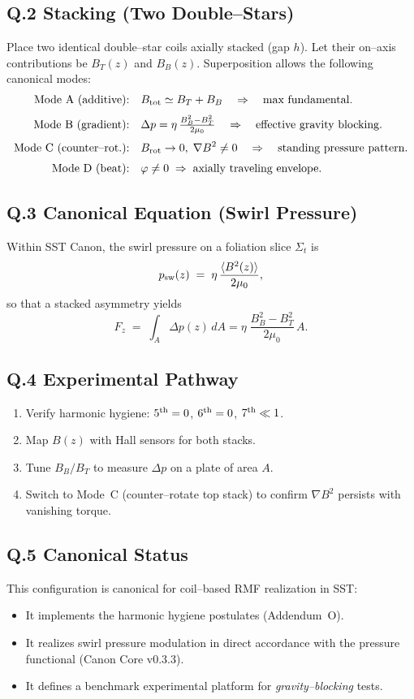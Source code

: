 \documentclass[11pt,a4paper]{article}
\begin{document}
\subsection*{Q.2 Stacking (Two Double--Stars)}
Place two identical double--star coils axially stacked (gap $h$).
Let their on--axis contributions be $B_T(z)$ and $B_B(z)$.
Superposition allows the following canonical modes:
\begin{align*}
	\text{Mode A (additive):}&\quad B_{\rm tot}\simeq B_T+B_B
	\quad\Rightarrow\quad \text{max fundamental}.\\[3pt]
	\text{Mode B (gradient):}&\quad \Delta p = \eta\,\tfrac{B_B^2-B_T^2}{2\mu_0}
	\quad\Rightarrow\quad \text{effective gravity blocking}.\\[3pt]
	\text{Mode C (counter--rot.):}&\quad B_{\rm rot}\to 0,\;
	\nabla B^2\neq 0
	\quad\Rightarrow\quad \text{standing pressure pattern}.\\[3pt]
	\text{Mode D (beat):}&\quad \varphi\neq 0\;\Rightarrow\;\text{axially traveling envelope}.
\end{align*}

\subsection*{Q.3 Canonical Equation (Swirl Pressure)}
Within SST Canon, the swirl pressure on a foliation slice $\Sigma_t$ is
\[
	p_{\rm sw}(z) \;=\; \eta\,\frac{\langle B^2(z)\rangle}{2\mu_0},
\]
so that a stacked asymmetry yields
\[
	F_z \;=\; \int_A \Delta p(z)\,dA
	=\eta\;\frac{B_B^2-B_T^2}{2\mu_0}\,A.
\]

\subsection*{Q.4 Experimental Pathway}
\begin{enumerate}
	\item Verify harmonic hygiene: $5^{\rm th}=0$, $6^{\rm th}=0$, $7^{\rm th}\ll1$.
	\item Map $B(z)$ with Hall sensors for both stacks.
	\item Tune $B_B/B_T$ to measure $\Delta p$ on a plate of area $A$.
	\item Switch to Mode~C (counter--rotate top stack) to confirm $\nabla B^2$ persists with vanishing torque.
\end{enumerate}

\subsection*{Q.5 Canonical Status}
This configuration is canonical for coil--based RMF realization in SST:
\begin{itemize}
	\item It implements the harmonic hygiene postulates (Addendum~O).
	\item It realizes swirl pressure modulation in direct accordance with the pressure functional (Canon Core v0.3.3).
	\item It defines a benchmark experimental platform for \emph{gravity--blocking} tests.
\end{itemize}
\end{document}

